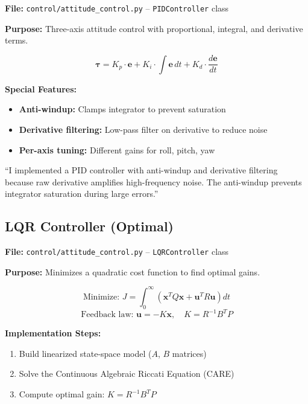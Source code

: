 \documentclass[11pt,a4paper]{article}
\begin{document}
\textbf{File:} \texttt{control/attitude\_control.py} -- \texttt{PIDController} class

\textbf{Purpose:} Three-axis attitude control with proportional, integral, and derivative terms.

\begin{keyequation}
\[
\boldsymbol{\tau} = K_p \cdot \mathbf{e} + K_i \cdot \int \mathbf{e} \, dt + K_d \cdot \frac{d\mathbf{e}}{dt}
\]
\end{keyequation}

\textbf{Special Features:}
\begin{itemize}[noitemsep]
    \item \textbf{Anti-windup:} Clamps integrator to prevent saturation
    \item \textbf{Derivative filtering:} Low-pass filter on derivative to reduce noise
    \item \textbf{Per-axis tuning:} Different gains for roll, pitch, yaw
\end{itemize}

\begin{interviewanswer}
``I implemented a PID controller with anti-windup and derivative filtering because raw derivative amplifies high-frequency noise. The anti-windup prevents integrator saturation during large errors.''
\end{interviewanswer}

\subsection{LQR Controller (Optimal)}

\textbf{File:} \texttt{control/attitude\_control.py} -- \texttt{LQRController} class

\textbf{Purpose:} Minimizes a quadratic cost function to find optimal gains.

\begin{keyequation}
\[
\text{Minimize: } J = \int_0^\infty \left( \mathbf{x}^T Q \mathbf{x} + \mathbf{u}^T R \mathbf{u} \right) dt
\]
\[
\text{Feedback law: } \mathbf{u} = -K\mathbf{x}, \quad K = R^{-1}B^T P
\]
\end{keyequation}

\textbf{Implementation Steps:}
\begin{enumerate}[noitemsep]
    \item Build linearized state-space model ($A$, $B$ matrices)
    \item Solve the Continuous Algebraic Riccati Equation (CARE)
    \item Compute optimal gain: $K = R^{-1}B^T P$
\end{enumerate}
\end{document}
